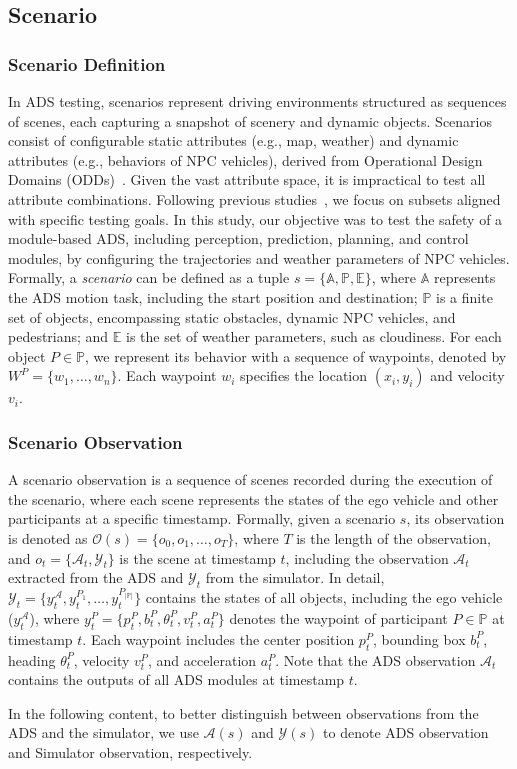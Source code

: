 \subsection{Scenario}
\subsubsection{Scenario Definition} In ADS testing, scenarios represent driving environments structured as sequences of scenes, each capturing a snapshot of scenery and dynamic objects. Scenarios consist of configurable static attributes (e.g., map, weather) and dynamic attributes (e.g., behaviors of NPC vehicles), derived from Operational Design Domains (ODDs)~\cite{thorn2018framework}.
Given the vast attribute space, it is impractical to test all attribute combinations. Following previous studies~\cite{cheng2023behavexplor, li2020av}, we focus on subsets aligned with specific testing goals. In this study, our objective was to test the safety of a module-based ADS, including perception, prediction, planning, and control modules, by configuring the trajectories and weather parameters of NPC vehicles.
Formally, a \textit{scenario} can be defined as a tuple $s = \{\mathbb{A}, \mathbb{P}, \mathbb{E}\}$, where $\mathbb{A}$ represents the ADS motion task, including the start position and destination; $\mathbb{P}$ is a finite set of objects, encompassing static obstacles, dynamic NPC vehicles, and pedestrians; and $\mathbb{E}$ is the set of weather parameters, such as cloudiness. For each object $P \in \mathbb{P}$, we represent its behavior with a sequence of waypoints, denoted by $W^{P} = \{w_{1}, \ldots, w_{n}\}$. Each waypoint $w_{i}$ specifies the location $(x_{i}, y_{i})$ and velocity $v_{i}$. 

\subsubsection{Scenario Observation} A scenario observation is a sequence of scenes recorded during the execution of the scenario, where each scene represents the states of the ego vehicle and other participants at a specific timestamp. Formally, given a scenario $s$, its observation is denoted as $\mathcal{O}(s) = \{o_0, o_1, \ldots, o_{T}\}$, where $T$ is the length of the observation, and $o_t = \{\mathcal{A}_{t}, \mathcal{Y}_t\}$ is the scene at timestamp $t$, including the observation $\mathcal{A}_{t}$ extracted from the ADS and $\mathcal{Y}_t$ from the simulator. In detail, $\mathcal{Y}_t = \{ y_t^\mathcal{A}, y_t^{P_{1}}, \ldots, y_t^{P_{|\mathbb{P}|}}\}$ contains the states of all objects, including the ego vehicle ($y_t^\mathcal{A}$), where $y_t^P = \{p_{t}^{P}, b_{t}^{P}, \theta_{t}^{P}, v_{t}^{P}, a_{t}^{P}\}$ denotes the waypoint of participant $P \in \mathbb{P}$ at timestamp $t$. Each waypoint includes the center position $p_{t}^{P}$, bounding box $b_{t}^{P}$, heading $\theta_{t}^{P}$, velocity $v_{t}^{P}$, and acceleration $a_{t}^{P}$.
Note that the ADS observation $\mathcal{A}_{t}$ contains the outputs of all ADS modules at timestamp $t$. 


In the following content, to better distinguish between observations from the ADS and the simulator, we use $\mathcal{A}(s)$ and $\mathcal{Y}(s)$ to denote ADS observation and Simulator observation, respectively. 
